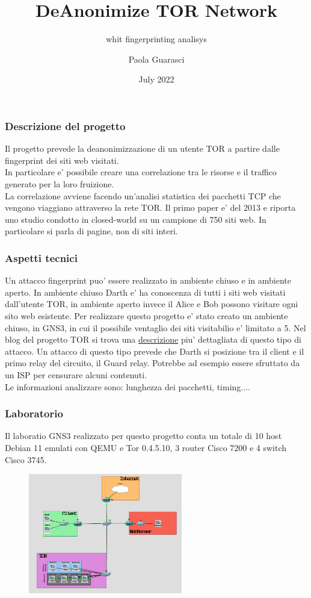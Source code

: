 \documentclass{beamer}[10pt]
\title[DeAnonTor]{DeAnonimize TOR Network}
\subtitle[]{whit fingerprinting analisys}
\author[Paola Guarasci]{Paola Guarasci}
\date[06/2022]{July 2022}
\begin{document}
\frame{\titlepage}

\begin{frame}
  \frametitle{Descrizione del progetto}
  Il progetto prevede la deanonimizzazione di un utente TOR a partire dalle fingerprint dei siti web visitati.
  \\In particolare e' possibile creare una correlazione tra le risorse e il traffico generato per la loro fruizione.
  \\La correlazione avviene facendo un'analisi statistica dei pacchetti TCP che vengono viaggiano attraverso la rete TOR.
  Il primo paper e' del 2013 e riporta uno studio condotto in closed-world su un campione di 750 siti web. In particolare si parla di pagine, non di siti interi. 
\end{frame}

\begin{frame}
  \frametitle{Aspetti tecnici}
  Un attacco fingerprint puo' essere realizzato in ambiente chiuso e in ambiente aperto. In ambiente chiuso Darth e' ha conoscenza di tutti i siti web visitati dall'utente TOR, in ambiente aperto invece il Alice e Bob possono visitare ogni sito web esistente. 
  Per realizzare questo progetto e' stato creato un ambiente chiuso, in GNS3, in cui il possibile ventaglio dei siti visitabilio e' limitato a 5. 
  Nel blog del progetto TOR si trova una \href{https://blog.torproject.org/critique-website-traffic-fingerprinting-attacks/}{descrizione}  piu' dettagliata di questo tipo di attacco. 
  Un attacco di questo tipo prevede che Darth si posizione tra il client e il primo relay del circuito, il Guard relay. Potrebbe ad esempio essere sfruttato da un ISP per censurare alcuni contenuti. 
  \\ Le informazioni analizzare sono: lunghezza dei pacchetti, timing....
\end{frame}

\begin{frame}
  \frametitle{Laboratorio}
  Il laboratio GNS3 realizzato per questo progetto conta un totale di 10 host Debian 11 emulati con QEMU e Tor 0.4.5.10, 3 router Cisco 7200 e 4 switch Cisco 3745.
  \begin{figure}
    \centering
    \includegraphics[width=0.60\textwidth]{../img/topology.png}
  \end{figure}

\end{frame}
\end{document}
